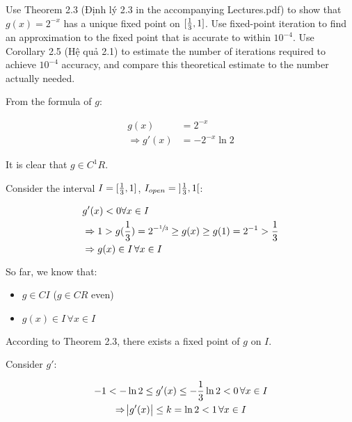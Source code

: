 \documentclass[../../../../Assignments]{subfiles}
\begin{document}
\begin{exercise}
    Use Theorem 2.3 (Định lý 2.3 in the accompanying Lectures.pdf) to show that
    \(g(x) = 2^{-x}\) has a unique fixed point on \(\interval{\frac{1}{3}}{1}\).
    Use fixed-point iteration to find an approximation to the fixed point that
    is accurate to within \(10^{-4}\). Use Corollary 2.5 (Hệ quả 2.1) to
    estimate the number of iterations required to achieve \(10^{-4}\) accuracy,
    and compare this theoretical estimate to the number actually needed.
\end{exercise}

\begin{solution}
    From the formula of \(g\):

    \[\begin{aligned}
                     g(x) & = 2^{-x} \\
        \Rightarrow g'(x) & = - 2^{-x} \ln{2}
    \end{aligned}\]

    It is clear that \(g \in C^1 R\).

    Consider the interval \(I = \interval{\frac{1}{3}}{1}\), \(I_{open} =
    \interval[open]{\frac{1}{3}}{1}\):

    \[\begin{aligned}
        &g'(x) < 0 \forall x \in I \\
        &\Rightarrow 1 > g(\frac{1}{3}) = 2^{-\sfrac{1}{3}} \geq g(x) \geq g(1) = 2^{-1} > \frac{1}{3} \\
        &\Rightarrow g(x) \in I \, \forall x \in I
    \end{aligned}\]

    So far, we know that:

    \begin{itemize}
        \item \(g \in C I\) (\(g \in C R\) even)
        \item \(g(x) \in I \, \forall x \in I\)
    \end{itemize}

    According to Theorem 2.3, there exists a fixed point of \(g\) on \(I\).

    Consider \(g'\):

    \begin{gather*}
        -1 < - \ln{2} \leq g'(x) \leq - \frac{1}{3} \ln{2} < 0 \, \forall x \in I \\
        \Rightarrow \abs{g'(x)} \leq k = \ln{2} < 1 \, \forall x \in I
    \end{gather*}


\end{solution}
\end{document}
